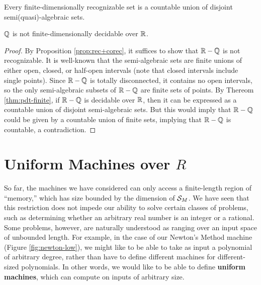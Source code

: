   \begin{corollary}
    Every finite-dimensionally recognizable set is a countable union
    of disjoint semi(quasi)-algebraic sets.
  \end{corollary}

  \begin{theorem}
    $\mathbb{Q}$ is not finite-dimensionally decidable over $\mathbb{R}$.
  \end{theorem}
  \begin{proof}
    By Proposition \ref{prop:rec+corec}, it suffices to show that
    $\mathbb{R} - \mathbb{Q}$ is not recognizable.  It is well-known that
    the semi-algebraic sets are finite unions of either open, closed,
    or half-open intervals (note that closed intervals include single
    points).  Since $\mathbb{R} - \mathbb{Q}$ is totally disconnected, it
    contains no open intervals, so the only semi-algebraic subsets of
    $\mathbb{R}-\mathbb{Q}$ are finite sets of points.  By Thereom
    \ref{thm:pdt-finite}, if $\mathbb{R}-\mathbb{Q}$ is decidable over
    $\mathbb{R}$, then it can be expressed as a countable union of
    disjoint semi-algebraic sets.  But this would imply that
    $\mathbb{R}-\mathbb{Q}$ could be given by a countable union of finite
    sets, implying that $\mathbb{R}-\mathbb{Q}$ is countable, a
    contradiction.
  \end{proof}
    
\section{Uniform Machines over $R$}

  So far, the machines we have considered can only access a
  finite-length region of ``memory,'' which has size bounded by the
  dimension of $\mathcal{S}_M$.  We have seen that this restriction
  does not impede our ability to solve certain classes of problems,
  such as determining whether an arbitrary real number is an integer
  or a rational.  Some problems, however, are naturally understood as
  ranging over an input space of unbounded length.  For example, in
  the case of our Newton's Method machine (Figure
  \ref{fig:newton-low}), we might like to be able to take as input a
  polynomial of arbitrary degree, rather than have to define different
  machines for different-sized polynomials.  In other words, we would
  like to be able to define \textbf{uniform machines}, which can
  compute on inputs of arbitrary size.\\


